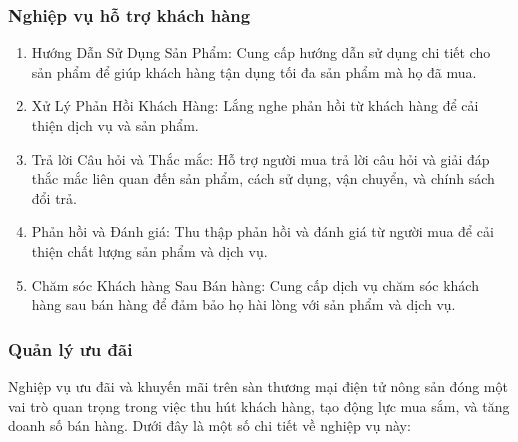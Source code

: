         \subsubsection{Nghiệp vụ hỗ trợ khách hàng}
	\begin{enumerate}
            \item Hướng Dẫn Sử Dụng Sản Phẩm:
        Cung cấp hướng dẫn sử dụng chi tiết cho sản phẩm để giúp khách hàng tận dụng tối đa sản phẩm mà họ đã mua.
		\item Xử Lý Phản Hồi Khách Hàng:
        Lắng nghe phản hồi từ khách hàng để cải thiện dịch vụ và sản phẩm.
            \item Trả lời Câu hỏi và Thắc mắc:
        Hỗ trợ người mua trả lời câu hỏi và giải đáp thắc mắc liên quan đến sản phẩm, cách sử dụng, vận chuyển, và chính sách đổi trả.
            \item Phản hồi và Đánh giá:
        Thu thập phản hồi và đánh giá từ người mua để cải thiện chất lượng sản phẩm và dịch vụ.
            \item Chăm sóc Khách hàng Sau Bán hàng:
        Cung cấp dịch vụ chăm sóc khách hàng sau bán hàng để đảm bảo họ hài lòng với sản phẩm và dịch vụ.
	\end{enumerate}
 
        \subsubsection{Quản lý ưu đãi}
        Nghiệp vụ ưu đãi và khuyến mãi trên sàn thương mại điện tử nông sản đóng một vai trò quan trọng trong việc thu hút khách hàng, tạo động lực mua sắm, và tăng doanh số bán hàng. Dưới đây là một số chi tiết về nghiệp vụ này:
        
